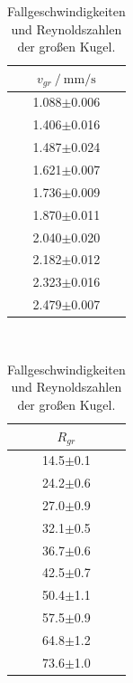 \begin{table}[h]
    \centering
    \label{tab:geschw_gr_rey}
    \caption{Fallgeschwindigkeiten und Reynoldszahlen der großen Kugel.}
    \begin{tabular}{c}
        \toprule
        {$v_{gr}\:/\:\si{\milli\meter\per\second}$} \\
        \midrule
        1.088$\pm$0.006 \\
        1.406$\pm$0.016 \\
        1.487$\pm$0.024 \\
        1.621$\pm$0.007 \\
        1.736$\pm$0.009 \\
        1.870$\pm$0.011 \\
        2.040$\pm$0.020 \\
        2.182$\pm$0.012 \\
        2.323$\pm$0.016 \\
        2.479$\pm$0.007 \\
        \bottomrule
    \end{tabular}
    $\qquad\qquad$
    \begin{tabular}{c}
        \toprule
        {$R_{gr}$} \\
        \midrule
        14.5$\pm$0.1 \\
        24.2$\pm$0.6 \\
        27.0$\pm$0.9 \\
        32.1$\pm$0.5 \\
        36.7$\pm$0.6 \\
        42.5$\pm$0.7 \\
        50.4$\pm$1.1 \\
        57.5$\pm$0.9 \\
        64.8$\pm$1.2 \\
        73.6$\pm$1.0 \\
        \bottomrule
    \end{tabular}     
\end{table}

